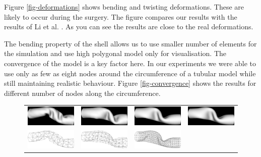 Figure \ref{fig-deformations} shows bending and twisting deformations.
These are likely to occur during the surgery.
The figure compares our
results with the results of Li et al. \cite{Li2009}. As you can see the
results are close to the real deformations.

The bending property of the shell allows us to use smaller number of
elements for the simulation and use high polygonal model only for
visualisation. The convergence of the model is a key factor here. In our
experiments we were able to use only as few as eight nodes around the
circumference of a tubular model while still maintaining realistic
behaviour. Figure \ref{fig-convergence} shows the results for different
number of nodes along the circumference.

\begin{figure}[tbh]
  \centering
  \begin{tabular}{cccc}
    \includegraphics[width=0.24\columnwidth]{img/twist-06-cg.png}
    &
    \includegraphics[width=0.24\columnwidth]{img/twist-08-cg.png}
    &
    \includegraphics[width=0.24\columnwidth]{img/twist-16-cg.png}
    &
    \includegraphics[width=0.24\columnwidth]{img/twist-31-cg.png}
    \\
    \includegraphics[width=0.24\columnwidth]{img/twist-06w-cg.png}
    &
    \includegraphics[width=0.24\columnwidth]{img/twist-08w-cg.png}
    &
    \includegraphics[width=0.24\columnwidth]{img/twist-16w-cg.png}

\end{tabular}
\end{figure}
